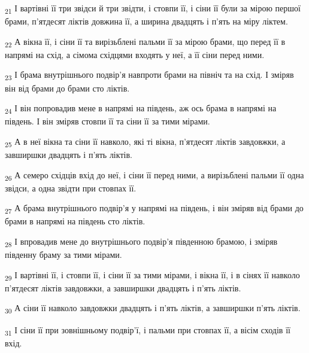 \begin{tcolorbox}
\textsubscript{21} І вартівні її три звідси й три звідти, і стовпи її, і сіни її були за мірою першої брами, п'ятдесят ліктів довжина її, а ширина двадцять і п'ять на міру ліктем.
\end{tcolorbox}
\begin{tcolorbox}
\textsubscript{22} А вікна її, і сіни її та вирізьблені пальми її за мірою брами, що перед її в напрямі на схід, а сімома східцями входять у неї, а її сіни перед ними.
\end{tcolorbox}
\begin{tcolorbox}
\textsubscript{23} І брама внутрішнього подвір'я навпроти брами на північ та на схід. І зміряв він від брами до брами сто ліктів.
\end{tcolorbox}
\begin{tcolorbox}
\textsubscript{24} І він попровадив мене в напрямі на південь, аж ось брама в напрямі на південь. І він зміряв стовпи її та сіни її за тими мірами.
\end{tcolorbox}
\begin{tcolorbox}
\textsubscript{25} А в неї вікна та сіни її навколо, які ті вікна, п'ятдесят ліктів завдовжки, а завширшки двадцять і п'ять ліктів.
\end{tcolorbox}
\begin{tcolorbox}
\textsubscript{26} А семеро східців вхід до неї, і сіни її перед ними, а вирізьблені пальми її одна звідси, а одна звідти при стовпах її.
\end{tcolorbox}
\begin{tcolorbox}
\textsubscript{27} А брама внутрішнього подвір'я у напрямі на південь, і він зміряв від брами до брами в напрямі на південь сто ліктів.
\end{tcolorbox}
\begin{tcolorbox}
\textsubscript{28} І впровадив мене до внутрішнього подвір'я південною брамою, і зміряв південну браму за тими мірами.
\end{tcolorbox}
\begin{tcolorbox}
\textsubscript{29} І вартівні її, і стовпи її, і сіни її за тими мірами, і вікна її, і в сінях її навколо п'ятдесят ліктів завдовжки, а завширшки двадцять і п'ять ліктів.
\end{tcolorbox}
\begin{tcolorbox}
\textsubscript{30} А сіни її навколо завдовжки двадцять і п'ять ліктів, а завширшки п'ять ліктів.
\end{tcolorbox}
\begin{tcolorbox}
\textsubscript{31} І сіни її при зовнішньому подвір'ї, і пальми при стовпах її, а вісім сходів її вхід.
\end{tcolorbox}
